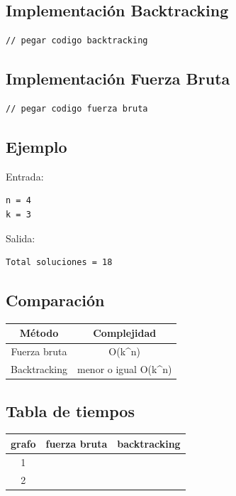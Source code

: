 \documentclass[12pt]{article}
\begin{document}
\subsection{Implementación Backtracking}

\begin{lstlisting}
// pegar codigo backtracking
\end{lstlisting}

\subsection{Implementación Fuerza Bruta}

\begin{lstlisting}
// pegar codigo fuerza bruta
\end{lstlisting}

\subsection{Ejemplo}

Entrada:

\begin{verbatim}
n = 4
k = 3
\end{verbatim}

Salida:

\begin{verbatim}
Total soluciones = 18
\end{verbatim}

\subsection{Comparación}

\begin{center}
\begin{tabular}{|c|c|}
\hline
Método & Complejidad \\
\hline
Fuerza bruta & O(k^n) \\
Backtracking & menor o igual O(k^n) \\
\hline
\end{tabular}
\end{center}

\subsection{Tabla de tiempos}

\begin{center}
\begin{tabular}{|c|c|c|}
\hline
grafo & fuerza bruta & backtracking \\
\hline
1 & & \\
2 & & \\
\hline
\end{tabular}
\end{center}
\end{document}
